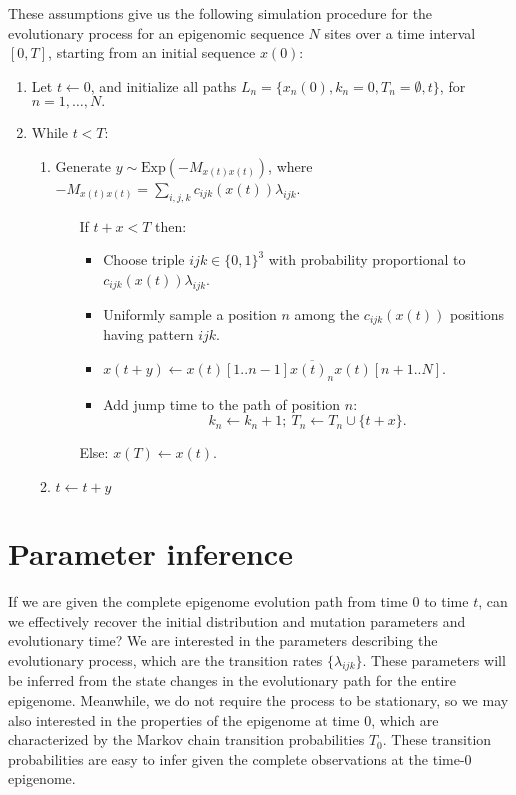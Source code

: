 \documentclass[11pt]{article}
\begin{document}
These assumptions give us the following simulation procedure for the
evolutionary process for an epigenomic sequence $N$ sites over a time
interval $[0, T]$, starting from an initial sequence $x(0)$:
\begin{enumerate}
\item Let $t \leftarrow 0$, and initialize all paths $L_n = \{x_n(0),
  k_n=0, T_n=\emptyset, t\}$, for $n=1,\ldots, N.$
\item While $t < T$:
  \begin{enumerate}
  \item Generate $y\sim \text{Exp}(-M_{x(t)x(t)})$, where
    $-M_{x(t)x(t)} = \sum_{i,j,k}c_{ijk}(x(t))\lambda_{ijk}$.
    \begin{itemize}
    \item[If] $t+x < T$ then:
      \begin{itemize}
      \item Choose triple $ijk \in \{0,1\}^3$ with
        probability proportional to $c_{ijk}(x(t))\lambda_{ijk}$.
      \item Uniformly sample a position $n$ among the $c_{ijk}(x(t))$ positions having pattern $ijk$.
      \item $x(t+y) \leftarrow x(t)[1..n-1]\overline{x(t)_n}x(t)[n+1..N]$.
      \item Add jump time to the path of position $n$:
        \[
        k_n \leftarrow k_n + 1; ~ T_n \leftarrow T_n\cup \{t+x\}.
        \]
      \end{itemize}
    \item[Else:] $x(T) \leftarrow x(t)$.
    \end{itemize}
  \item $t \leftarrow t+y$
  \end{enumerate}
\end{enumerate}

\section{Parameter inference}

If we are given the complete epigenome evolution path from time $0$ to
time $t$, can we effectively recover the initial distribution and
mutation parameters and evolutionary time? We are interested in the
parameters describing the evolutionary process, which are the
transition rates $\{\lambda_{ijk}\}$. These parameters will be
inferred from the state changes in the evolutionary path for the
entire epigenome. Meanwhile, we do not require the process to be
stationary, so we may also interested in the properties of the
epigenome at time 0, which are characterized by the Markov chain
transition probabilities $T_{0}$. These transition probabilities are
easy to infer given the complete observations at the time-0 epigenome.
\end{document}
